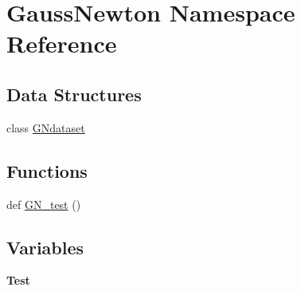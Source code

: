 \hypertarget{namespace_gauss_newton}{}\section{Gauss\+Newton Namespace Reference}
\label{namespace_gauss_newton}
\subsection*{Data Structures}
\begin{DoxyCompactItemize}
\item 
class \mbox{\hyperlink{class_gauss_newton_1_1_g_ndataset}{G\+Ndataset}}
\end{DoxyCompactItemize}
\subsection*{Functions}
\begin{DoxyCompactItemize}
\item 
def \mbox{\hyperlink{namespace_gauss_newton_a11c318bc24f03725e9bc293ef30829bc}{G\+N\+\_\+test}} ()
\end{DoxyCompactItemize}
\subsection*{Variables}
\begin{DoxyCompactItemize}
\item 
{\bfseries Test}
\end{DoxyCompactItemize}


